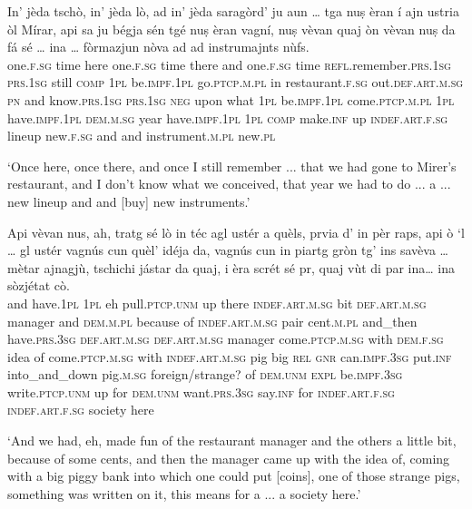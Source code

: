 \begin{linenumbers}
\gll    In’ jèda tschò, in’ jèda lò, ad in’ jèda saragòrd’ ju aun … tga nuṣ èran í ajn ustria òl Mírar, api sa ju bégja sén tgé nuṣ èran vagní, nuṣ vèvan quaj òn vèvan nuṣ da fá sé … ina … fòrmazjun nòva ad ad instrumajnts nùfs.\\
one.\textsc{f.sg} time here one.\textsc{f.sg} time there and one.\textsc{f.sg} time \textsc{refl}.remember.\textsc{prs.1sg} \textsc{prs.1sg} still {}  \textsc{comp} \textsc{1pl} be.\textsc{impf.1pl} go.\textsc{ptcp.m.pl} in restaurant.\textsc{f.sg} out.\textsc{def.art.m.sg} \textsc{pn} and  know.\textsc{prs.1sg} \textsc{prs.1sg} \textsc{neg} upon what \textsc{1pl} be.\textsc{impf.1pl} come.\textsc{ptcp.m.pl} \textsc{1pl} have.\textsc{impf.1pl} \textsc{dem.m.sg} year have.\textsc{impf.1pl} \textsc{1pl} \textsc{comp} make.\textsc{inf} up {} \textsc{indef.art.f.sg} {} lineup  new.\textsc{f.sg} and and instrument.\textsc{m.pl} new.\textsc{pl}\\
\end{linenumbers}
\medskip
\glt `Once here, once there, and once I still remember ... that we had gone to Mirer's restaurant, and I don't know what we conceived, that year we had to do ... a ... new lineup and and [buy] new instruments.'
\medskip

\begin{linenumbers}
\gll  Api vèvan nus, ah, tratg sé lò in téc agl ustér a quèls, prvia d’ in pèr raps, api ò `l … gl ustér vagnús cun quèl’ idéja da, vagnús cun in piartg gròn tg’ ins savèva … mètar ajnagjù, tschichi jástar da quaj, i èra scrét sé pr, quaj vùt di par ina… ina sòzjétat cò.\\
and have.\textsc{1pl} \textsc{1pl} eh pull.\textsc{ptcp.unm} up there \textsc{indef.art.m.sg} bit \textsc{def.art.m.sg} manager and \textsc{dem.m.pl} because of \textsc{indef.art.m.sg} pair cent.\textsc{m.pl} and\_then have.\textsc{prs.3sg} \textsc{def.art.m.sg} {} \textsc{def.art.m.sg} manager  come.\textsc{ptcp.m.sg}  with \textsc{dem.f.sg} idea of come.\textsc{ptcp.m.sg} with \textsc{indef.art.m.sg} pig big \textsc{rel} \textsc{gnr} can.\textsc{impf.3sg} {} put.\textsc{inf} into\_and\_down pig.\textsc{m.sg} foreign/strange? of \textsc{dem.unm} \textsc{expl} be.\textsc{impf.3sg} write.\textsc{ptcp.unm} up for \textsc{dem.unm} want.\textsc{prs.3sg} say.\textsc{inf} for \textsc{indef.art.f.sg} \textsc{indef.art.f.sg} society here \\
\end{linenumbers}
\medskip
\glt `And we had, eh, made fun of the restaurant manager and the others a little bit, because of some cents, and then the manager came up with the idea of, coming with a big piggy bank into which one could put [coins], one of those strange pigs, something was written on it, this means for a ... a society here.'
\medskip

